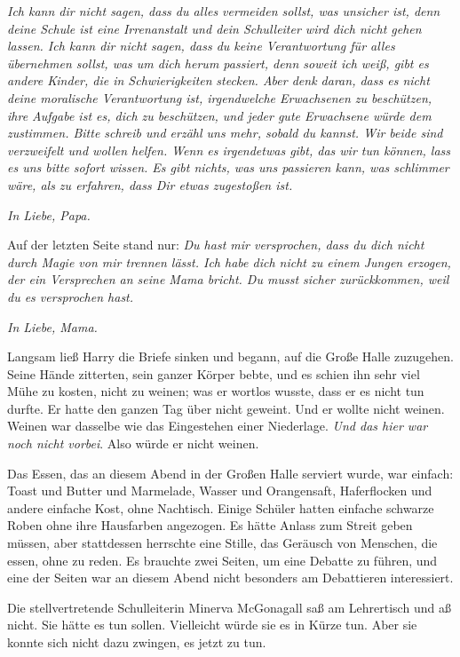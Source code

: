 \emph{Ich kann dir nicht sagen, dass du alles vermeiden sollst, was unsicher
ist, denn deine Schule ist eine Irrenanstalt und dein Schulleiter wird dich
nicht gehen lassen. Ich kann dir nicht sagen, dass du keine Verantwortung für
alles übernehmen sollst, was um dich herum passiert, denn soweit ich weiß, gibt
es andere Kinder, die in Schwierigkeiten} \emph{stecken. Aber denk daran, dass
es nicht deine moralische Verantwortung ist, irgendwelche Erwachsenen zu
beschützen, ihre Aufgabe ist es, dich zu beschützen, und jeder gute Erwachsene
würde dem zustimmen. Bitte schreib und erzähl uns mehr, sobald du kannst. Wir
beide sind verzweifelt und wollen helfen. Wenn es irgendetwas gibt, das wir tun
können, lass es uns bitte sofort wissen. Es gibt nichts, was uns passieren kann,
was schlimmer wäre, als zu erfahren, dass Dir etwas zugestoßen ist.}

\emph{In Liebe, Papa.}

Auf der letzten Seite stand nur: \emph{Du hast mir versprochen, dass du dich
nicht durch Magie von mir trennen lässt. Ich habe dich nicht zu einem Jungen
erzogen, der ein Versprechen an seine Mama bricht. Du musst sicher zurückkommen,
weil du es versprochen hast.}

\emph{In Liebe, Mama.}

Langsam ließ Harry die Briefe sinken und begann, auf die Große Halle zuzugehen.
Seine Hände zitterten, sein ganzer Körper bebte, und es schien ihn sehr viel
Mühe zu kosten, nicht zu weinen; was er wortlos wusste, dass er es nicht tun
durfte. Er hatte den ganzen Tag über nicht geweint. Und er wollte nicht weinen.
Weinen war dasselbe wie das Eingestehen einer Niederlage. \emph{Und das hier war
noch nicht vorbei}. Also würde er nicht weinen.

Das Essen, das an diesem Abend in der Großen Halle serviert wurde, war einfach:
Toast und Butter und Marmelade, Wasser und Orangensaft, Haferflocken und andere
einfache Kost, ohne Nachtisch. Einige Schüler hatten einfache schwarze Roben
ohne ihre Hausfarben angezogen. Es hätte Anlass zum Streit geben müssen, aber
stattdessen herrschte eine Stille, das Geräusch von Menschen, die essen, ohne zu
reden. Es brauchte zwei Seiten, um eine Debatte zu führen, und eine der Seiten
war an diesem Abend nicht besonders am Debattieren interessiert.

Die stellvertretende Schulleiterin Minerva McGonagall saß am Lehrertisch und aß
nicht. Sie hätte es tun sollen. Vielleicht würde sie es in Kürze tun. Aber sie
konnte sich nicht dazu zwingen, es jetzt zu tun.

